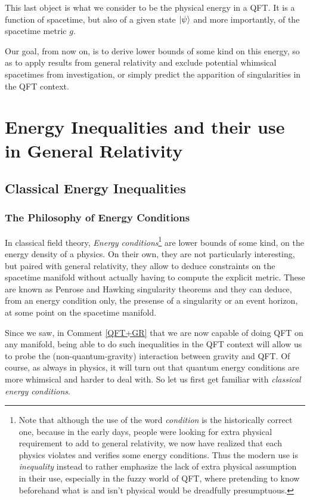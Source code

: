 \documentclass[a4paper,11pt]{article}
\numberwithin{equation}{section}
\theoremstyle{definition}
\begin{document}
    This last object is what we consider to be the physical energy in a QFT. It is a function of spacetime, but also of a given state $\ket{\psi}$ and more importantly, of the spacetime metric $g$.

    Our goal, from now on, is to derive lower bounds of some kind on this energy, so as to apply results from general relativity and exclude potential whimsical spacetimes from investigation, or simply predict the apparition of singularities in the QFT context.
    
\section{Energy Inequalities and their use in General Relativity}
\subsection{Classical Energy Inequalities}
\subsubsection{The Philosophy of Energy Conditions}
In classical field theory, \emph{Energy conditions}\footnote{Note that although the use of the word \textit{condition} is the historically correct one, because in the early days, people were looking for extra physical requirement to add to general relativity, we now have realized that each physics violates and verifies some energy conditions. Thus the modern use is \textit{inequality} instead to rather emphasize the lack of extra physical assumption in their use, especially in the fuzzy world of QFT, where pretending to know beforehand what is and isn't physical would be dreadfully presumptuous.} are lower bounds of some kind, on the energy density of a physics. On their own, they are not particularly interesting, but paired with general relativity, they allow to deduce constraints on the spacetime manifold without actually having to compute the explicit metric. These are known as Penrose and Hawking singularity theorems \cite{SingTheo} and they can deduce, from an energy condition only, the presense of a singularity or an event horizon, at some point on the spacetime manifold. 

Since we saw, in Comment \ref{QFT+GR} that we are now capable of doing QFT on any manifold, being able to do such inequalities in the QFT context will allow us to probe the (non-quantum-gravity) interaction between gravity and QFT. Of course, as always in physics, it will turn out that quantum energy conditions are more whimsical and harder to deal with. So let us first get familiar with \emph{classical energy conditions}.
\end{document}
